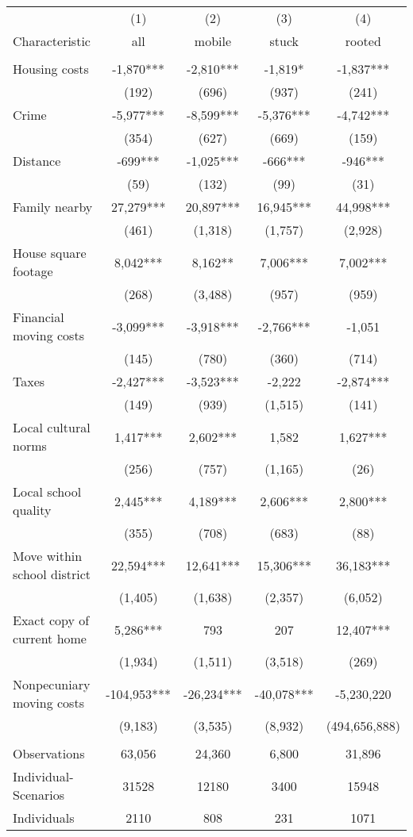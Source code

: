 \begin{tabular}{lcccc} \hline
 & (1) & (2) & (3) & (4) \\
Characteristic & all & mobile & stuck & rooted \\ \hline
 &  &  &  &  \\
Housing costs & -1,870*** & -2,810*** & -1,819* & -1,837*** \\
 & (192) & (696) & (937) & (241) \\
Crime & -5,977*** & -8,599*** & -5,376*** & -4,742*** \\
 & (354) & (627) & (669) & (159) \\
Distance & -699*** & -1,025*** & -666*** & -946*** \\
 & (59) & (132) & (99) & (31) \\
Family nearby & 27,279*** & 20,897*** & 16,945*** & 44,998*** \\
 & (461) & (1,318) & (1,757) & (2,928) \\
House square footage & 8,042*** & 8,162** & 7,006*** & 7,002*** \\
 & (268) & (3,488) & (957) & (959) \\
Financial moving costs & -3,099*** & -3,918*** & -2,766*** & -1,051 \\
 & (145) & (780) & (360) & (714) \\
Taxes & -2,427*** & -3,523*** & -2,222 & -2,874*** \\
 & (149) & (939) & (1,515) & (141) \\
Local cultural norms & 1,417*** & 2,602*** & 1,582 & 1,627*** \\
 & (256) & (757) & (1,165) & (26) \\
Local school quality & 2,445*** & 4,189*** & 2,606*** & 2,800*** \\
 & (355) & (708) & (683) & (88) \\
Move within school district & 22,594*** & 12,641*** & 15,306*** & 36,183*** \\
 & (1,405) & (1,638) & (2,357) & (6,052) \\
Exact copy of current home & 5,286*** & 793 & 207 & 12,407*** \\
 & (1,934) & (1,511) & (3,518) & (269) \\
Nonpecuniary moving costs & -104,953*** & -26,234*** & -40,078*** & -5,230,220 \\
 & (9,183) & (3,535) & (8,932) & (494,656,888) \\
 &  &  &  &  \\
Observations & 63,056 & 24,360 & 6,800 & 31,896 \\
Individual-Scenarios & 31528 & 12180 & 3400 & 15948 \\
 Individuals & 2110 & 808 & 231 & 1071 \\ \hline
\end{tabular}
